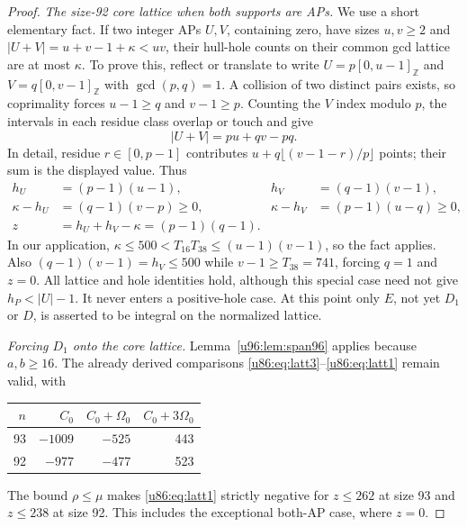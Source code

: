 \documentclass[11pt,a4paper]{article}
\theoremstyle{remark}
\newcommand{\Z}{\mathbb Z}
\begin{document}
\begin{proof}
\emph{The size-92 core lattice when both supports are APs.}
We use a short elementary fact. If two integer APs $U,V$, containing
zero, have sizes $u,v\ge2$ and
$|U+V|=u+v-1+\kappa<uv$, their hull-hole counts on their common gcd
lattice are at most $\kappa$. To prove this, reflect or translate to
write $U=p[0,u-1]_{\Z}$ and $V=q[0,v-1]_{\Z}$ with $\gcd(p,q)=1$.
A collision of two distinct pairs exists, so coprimality forces
$u-1\ge q$ and $v-1\ge p$. Counting the $V$ index modulo $p$, the
intervals in each residue class overlap or touch and give
\[
 |U+V|=pu+qv-pq.
\]
In detail, residue $r\in[0,p-1]$ contributes
$u+q\lfloor(v-1-r)/p\rfloor$ points; their sum is the displayed value.
Thus
\begin{align*}
 h_U&=(p-1)(u-1),&h_V&=(q-1)(v-1),\\
 \kappa-h_U&=(q-1)(v-p)\ge0,&
 \kappa-h_V&=(p-1)(u-q)\ge0,\\
 z&=h_U+h_V-\kappa=(p-1)(q-1).
\end{align*}
In our application,
$\kappa\le500<T_{16}T_{38}\le(u-1)(v-1)$, so the fact applies.
Also $(q-1)(v-1)=h_V\le500$ while $v-1\ge T_{38}=741$, forcing $q=1$
and $z=0$. All lattice and hole identities hold, although this special
case need not give $h_P<|U|-1$. It never enters a positive-hole case.
At this point only $E$, not yet $D_1$ or $D$, is asserted to be integral
on the normalized lattice.

\emph{Forcing $D_1$ onto the core lattice.}
Lemma~\ref{u96:lem:span96} applies because $a,b\ge16$. The already derived
comparisons \eqref{u86:eq:latt3}--\eqref{u86:eq:latt1} remain valid, with
\begin{center}\small
\begin{tabular}{rrrr}
\toprule
$n$&$C_0$&$C_0+\Omega_0$&$C_0+3\Omega_0$\\\midrule
93&$-1009$&$-525$&443\\
92&$-977$&$-477$&523\\\bottomrule
\end{tabular}
\end{center}
The bound $\rho\le\mu$ makes \eqref{u86:eq:latt1} strictly negative for
$z\le262$ at size 93 and $z\le238$ at size 92. This includes the
exceptional both-AP case, where $z=0$.


\end{proof}
\end{document}
